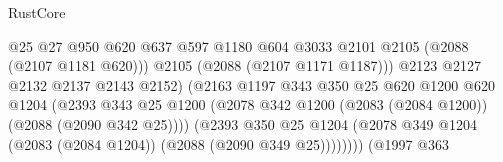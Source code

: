 \begin{lexlean}{RustCore}
\begin{coremodule}
                                                @25
                                                @27
                                                @950
                                                @620
                                                @637
                                                @597
                                                @1180
                                                @604
                                                @3033
                                                @2101
                                                @2105
                                                (@2088 (@2107 @1181 @620)))
                                              @2105
                                              (@2088 (@2107 @1171 @1187)))
                                            @2123
                                            @2127
                                            @2132
                                            @2137
                                            @2143
                                            @2152)
                                          (@2163
                                            @1197
                                            @343
                                            @350
                                            @25
                                            @620
                                            @1200
                                            @620
                                            @1204
                                            (@2393
                                              @343
                                              @25
                                              @1200
                                              (@2078
                                                @342
                                                @1200
                                                (@2083 (@2084 @1200))
                                                (@2088 (@2090 @342 @25))))
                                            (@2393
                                              @350
                                              @25
                                              @1204
                                              (@2078
                                                @349
                                                @1204
                                                (@2083 (@2084 @1204))
                                                (@2088 (@2090 @349 @25))))))))
                                    (@1997
                                      @363

\end{coremodule}
\end{lexlean}
